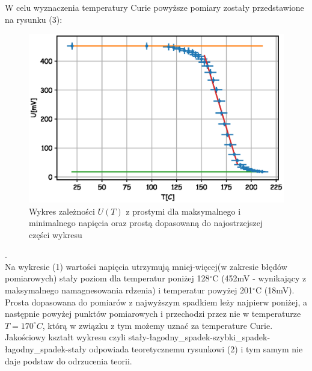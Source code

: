 \documentclass[a4paper,10pt]{article}
\begin{document}
W celu wyznaczenia temperatury Curie powyższe pomiary zostały przedstawione na rysunku (3):
\begin{figure}[H]
  \includegraphics{./Curie_proste.eps}
  \caption{Wykres zależności $U(T)$ z prostymi dla maksymalnego i minimalnego napięcia oraz prostą dopasowaną do najostrzejszej części wykresu}
\end{figure}.
\\Na wykresie (1) wartości napięcia utrzymują mniej-więcej(w zakresie błędów pomiarowych) stały poziom dla temperatur poniżej 128$^\circ$C (452mV - wynikający z maksymalnego namagnesowania rdzenia) i temperatur powyżej 201$^\circ$C (18mV). Prosta dopasowana do pomiarów z najwyższym spadkiem leży najpierw poniżej, a następnie powyżej punktów pomiarowych i przechodzi przez nie w temperaturze $T = 170^\circ C$, którą w związku z tym możemy uznać za temperature Curie. Jakościowy kształt wykresu czyli stały-łagodny_spadek-szybki_spadek-łagodny_spadek-stały odpowiada teoretycznemu rysunkowi (2) i tym samym nie daje podstaw do odrzucenia teorii.
\end{document}
